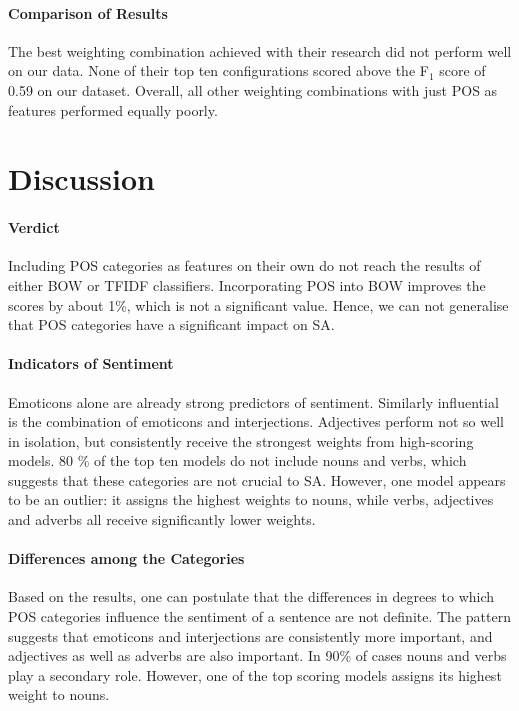 \documentclass[titlepage]{article}
\begin{document}
      
      \paragraph{Comparison of Results}
   The best weighting combination \citet{improving-sa} achieved with their research did not perform well on our data. None of their top ten configurations scored above the F$_{1}$ score of 0.59 on our dataset. Overall, all other weighting combinations with just POS as features performed equally poorly. 
      
      
\section{Discussion}


   \paragraph{Verdict}
Including POS categories as features on their own do not reach the results of either BOW or TFIDF classifiers. Incorporating POS into BOW improves the scores by about 1\%, which is not a significant value. Hence, we can not generalise that POS categories have a significant impact on SA.

\paragraph{Indicators of Sentiment}

Emoticons alone are already strong predictors of sentiment. Similarly influential is the combination of emoticons and interjections. Adjectives perform not so well in isolation, but consistently receive the strongest weights from high-scoring models. 80 \% of the top ten models do not include nouns and verbs, which suggests that these categories are not crucial to SA. However, one model appears to be an outlier: it assigns the highest weights to nouns, while verbs, adjectives and adverbs all receive significantly lower weights. 

      \paragraph{Differences among the Categories}
Based on the results, one can postulate that the differences in degrees to which POS categories influence the sentiment of a sentence are not definite. The pattern suggests that emoticons and interjections are consistently more important, and adjectives as well as adverbs are also important. In 90\% of cases nouns and verbs play a secondary role. However, one of the top scoring models assigns its highest weight to nouns.
\end{document}
